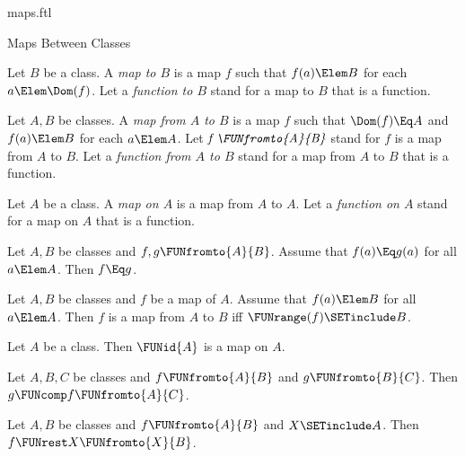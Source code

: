 \documentclass{stex}
\begin{document}
\begin{smodule}{maps.ftl}
\begin{sfragment}{Maps Between Classes}
  \begin{definition}[forthel,for={map,function}]
    Let $B$ be a class.
    A \emph{map to $B$} is a map $f$ such that $f(a) \Elem B$ for each $a \Elem \Dom(f)$.
    Let a \emph{function to $B$} stand for a map to $B$ that is a function.
  \end{definition}

  \begin{definition}[forthel,for={map,FUNfromto,function}]
    Let $A, B$ be classes.
    A \emph{map from $A$ to $B$} is a map $f$ such that $\Dom(f) \Eq A$ and $f(a) \Elem B$ for each $a \Elem A$.
    Let $\emph{f \FUNfromto{A}{B}}$ stand for $f$ is a map from $A$ to $B$.
    Let a \emph{function from $A$ to $B$} stand for a map from $A$ to $B$ that is a function.
  \end{definition}

  \begin{definition}[forthel,for={map,function}]
    Let $A$ be a class.
    A \emph{map on $A$} is a map from $A$ to $A$.
    Let a \emph{function on $A$} stand for a map on $A$ that is a function.
  \end{definition}

  \begin{proposition}[forthel]
    Let $A, B$ be classes and $f, g \FUNfromto{A}{B}$.
    Assume that $f(a) \Eq g(a)$ for all $a \Elem A$.
    Then $f \Eq g$.
  \end{proposition}

  \begin{proposition}
    Let $A, B$ be classes and $f$ be a map of $A$.
    Assume that $f(a) \Elem B$ for all $a \Elem A$.
    Then $f$ is a map from $A$ to $B$ iff $\FUNrange(f) \SETinclude B$.
  \end{proposition}

  \begin{proposition}[forthel]
    Let $A$ be a class.
    Then $\FUNid{A}$ is a map on $A$.
  \end{proposition}

  \begin{proposition}[forthel]
    Let $A, B, C$ be classes and $f \FUNfromto{A}{B}$ and $g \FUNfromto{B}{C}$.
    Then $g \FUNcomp f \FUNfromto{A}{C}$.
  \end{proposition}

  \begin{proposition}[forthel]
    Let $A, B$ be classes and $f \FUNfromto{A}{B}$ and $X \SETinclude A$.
    Then $f \FUNrest X \FUNfromto{X}{B}$.
  \end{proposition}


\end{sfragment}
\end{smodule}
\end{document}
